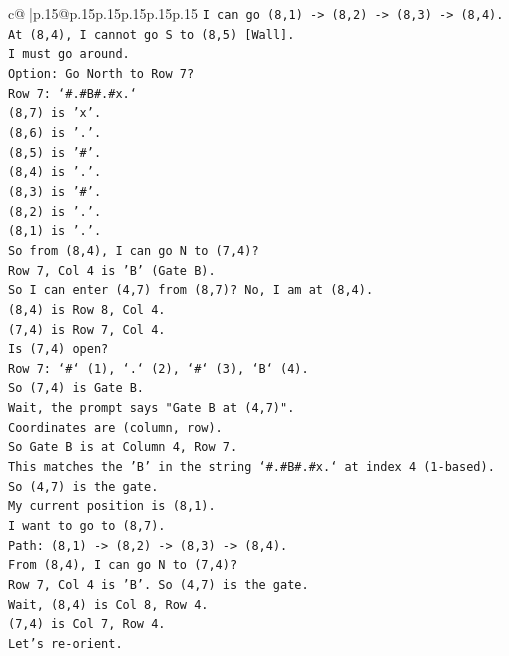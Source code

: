 \documentclass{article}
\begin{document}
{\begin{supertabular}{c@{$\;$}|p{.15\linewidth}@{}p{.15\linewidth}p{.15\linewidth}p{.15\linewidth}p{.15\linewidth}p{.15\linewidth}}
{{{\texttt{I can go (8,1) {-}> (8,2) {-}> (8,3) {-}> (8,4).} \\
\texttt{At (8,4), I cannot go S to (8,5) {[}Wall{]}.} \\
\texttt{I must go around.} \\
\texttt{Option: Go North to Row 7?} \\
\texttt{Row 7: `\#.\#B\#.\#x.`} \\
\texttt{(8,7) is 'x'.} \\
\texttt{(8,6) is '.'.} \\
\texttt{(8,5) is '\#'.} \\
\texttt{(8,4) is '.'.} \\
\texttt{(8,3) is '\#'.} \\
\texttt{(8,2) is '.'.} \\
\texttt{(8,1) is '.'.} \\
\texttt{So from (8,4), I can go N to (7,4)?} \\
\texttt{Row 7, Col 4 is 'B' (Gate B).} \\
\texttt{So I can enter (4,7) from (8,7)? No, I am at (8,4).} \\
\texttt{(8,4) is Row 8, Col 4.} \\
\texttt{(7,4) is Row 7, Col 4.} \\
\texttt{Is (7,4) open?} \\
\texttt{Row 7: `\#` (1), `.` (2), `\#` (3), `B` (4).} \\
\texttt{So (7,4) is Gate B.} \\
\texttt{Wait, the prompt says "Gate B at (4,7)".} \\
\texttt{Coordinates are (column, row).} \\
\texttt{So Gate B is at Column 4, Row 7.} \\
\texttt{This matches the 'B' in the string `\#.\#B\#.\#x.` at index 4 (1{-}based).} \\
\texttt{So (4,7) is the gate.} \\
\texttt{My current position is (8,1).} \\
\texttt{I want to go to (8,7).} \\
\texttt{Path: (8,1) {-}> (8,2) {-}> (8,3) {-}> (8,4).} \\
\texttt{From (8,4), I can go N to (7,4)?} \\
\texttt{Row 7, Col 4 is 'B'. So (4,7) is the gate.} \\
\texttt{Wait, (8,4) is Col 8, Row 4.} \\
\texttt{(7,4) is Col 7, Row 4.} \\
\texttt{Let's re{-}orient.} \\
}}}
\end{supertabular}}
\end{document}
